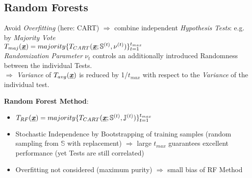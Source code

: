\begin{sectionbox}
	\subsection{Random Forests}	
	Avoid \textit{Overfitting} (here: CART) $\Rightarrow$ combine independent \textit{Hypothesis Tests}: e.g. by \textit{Majority Vote}\\ $T_{maj}(\underline{\textbf{\textit{x}}})=majority\{T_{CART}(\underline{\textbf{\textit{x}}};\mathbb{S}^{(t)},\nu^{(t)})\}_{t=1}^{t_{max}}$\\
	\textit{Randomization Parameter} $\nu_t$ controls an additionally introduced
	Randomness between the individual Tests.\\
	$\Rightarrow$ \textit{Variance} of $T_{avg}(\underline{\textbf{\textit{x}}})$ is reduced by 1/$t_{max}$ with respect to the \textit{Variance} of the individual test.
	
	\textbf{Random Forest Method}:
	\begin{itemize}
		\item $T_{RF}(\underline{\textbf{\textit{x}}})=majority\{T_{CART}(\underline{\textbf{\textit{x}}};\mathbb{S}^{(t)},\mathbb{J}^{(t)})\}_{t=1}^{t_{max}}$
		\item Stochastic Independence by Bootstrapping of training samples (random sampling from $\mathbb{S}$ with replacement) $\Rightarrow$ large $t_{max}$ guarantees excellent performance (yet Tests are still correlated)
		\item Overfitting not considered (maximum purity) $\Rightarrow$ small bias of RF Method
	\end{itemize}
\end{sectionbox}
